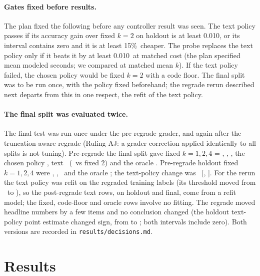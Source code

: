 \documentclass[11pt]{article}
\makeatletter
\def\sg@aux#1#2\relax{\if#1-$-$#2\else\if#1+{+}#2\else{+}#1#2\fi\fi}
\newcommand{\sg}[1]{\expandafter\sg@aux#1\relax}
\newcommand{\GateGain}{0.010}%
\newcommand{\GateCheap}{15\%}%
\newcommand{\GateProbeGain}{0.010}%
\makeatother
\begin{document}
\paragraph{Gates fixed before results.}
The plan fixed the following before any controller result was seen. The text policy passes if its accuracy gain over fixed $k{=}2$ on holdout is at least \GateGain, or its interval contains zero and it is at least \GateCheap\ cheaper. The probe replaces the text policy only if it beats it by at least \GateProbeGain\ at matched cost (the plan specified mean modeled seconds; we compared at matched mean $k$). If the text policy failed, the chosen policy would be fixed $k{=}2$ with a code floor. The final split was to be run once, with the policy fixed beforehand; the regrade rerun described next departs from this in one respect, the refit of the text policy.

\paragraph{The final split was evaluated twice.}
The final test was run once under the pre-regrade grader, and again after the truncation-aware regrade (Ruling AJ: a grader correction applied identically to all splits is not tuning). Pre-regrade the final split gave fixed $k{=}1,2,4$ = \FinalPreFixedOneAcc, \FinalPreFixedTwoAcc, \FinalPreFixedFourAcc, the chosen policy \FinalPreChosenAcc, text \FinalPreTextAcc\ (\sg{\FinalPreTextDelta}\ vs fixed 2) and the oracle \FinalPreOracleAcc. Pre-regrade holdout fixed $k{=}1,2,4$ were \HoldoutPreFixedOneAcc, \HoldoutPreFixedTwoAcc, \HoldoutPreFixedFourAcc\ and the oracle \HoldoutPreOracleAcc; the text-policy change was \sg{\HoldoutTextPreDelta}\ [\sg{\HoldoutTextPreLo}, \sg{\HoldoutTextPreHi}]. For the rerun the text policy was refit on the regraded training labels (its threshold moved from \FinalPreTextTau\ to \FinalTextTau), so the post-regrade text rows, on holdout and final, come from a refit model; the fixed, code-floor and oracle rows involve no fitting. The regrade moved headline numbers by a few items and no conclusion changed (the holdout text-policy point estimate changed sign, from \sg{\HoldoutTextPreDelta} to \sg{\HoldoutTextDelta}; both intervals include zero). Both versions are recorded in \texttt{results/decisions.md}.

\section{Results}
\end{document}
